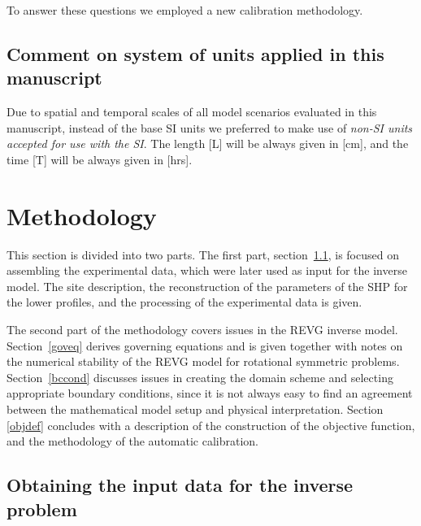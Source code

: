 \documentclass[review,times,3p,twocolumn,10pt]{elsarticle}
\begin{document}
To answer these questions we employed a new calibration methodology. 




\subsection{Comment on system of units applied in this manuscript}

Due to spatial and temporal scales of all model scenarios evaluated in this manuscript, instead of the base SI units we preferred to make use of {\it non-SI units  accepted for use with the SI}. The length [L] will be always given in [cm], and the time [T] will be always given in [hrs].






\section{Methodology}%
\label{metodo}


This section is divided into two parts. The first part, section~\ref{assamb}, is focused on assembling the experimental data, which were later used as input for the inverse model. The site description, the reconstruction of the parameters of the SHP for the lower profiles, and the processing of the experimental data is given.   

The second part of the methodology covers issues in the REVG inverse model. Section~\ref{goveq} derives governing equations and is given together with notes on the numerical stability of the REVG model for rotational symmetric problems.
Section~\ref{bccond} discusses issues in creating the domain scheme and selecting appropriate boundary conditions, since it is not always easy to find an agreement between the mathematical model setup and  physical interpretation. Section \ref{objdef} concludes with a description of the construction of the objective function, and the methodology of the automatic calibration. 



\subsection{Obtaining the input data for the inverse problem}
\label{assamb}
\end{document}
